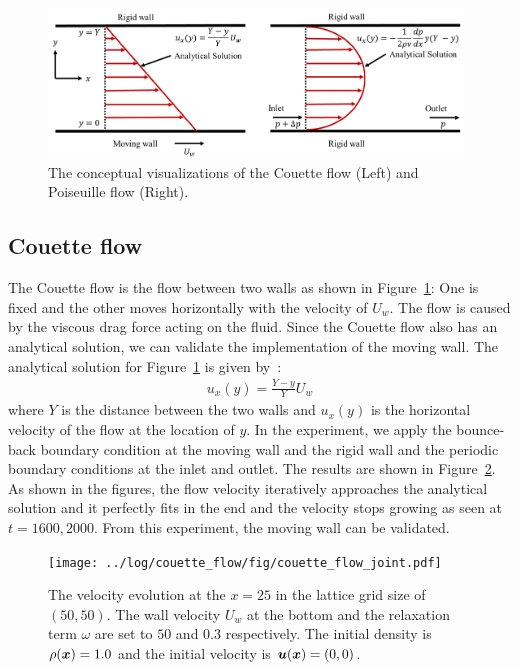 \begin{figure}[H]
  \centering
  \includegraphics[width=0.98\textwidth]{imgs/couette_and_poiseuille.pdf}
  \caption{The conceptual visualizations of the Couette flow (Left) and
  Poiseuille flow (Right).}
  \label{couette-and-poiseuille-conceptual}
\end{figure}


\subsection{Couette flow}
The Couette flow is the flow between two walls as shown in
Figure~\ref{couette-and-poiseuille-conceptual}:
One is fixed and the other moves horizontally with the velocity of $U_w$.
The flow is caused by the viscous drag force acting on the fluid.
Since the Couette flow also has an analytical solution,
we can validate the implementation of the moving wall.
The analytical solution for Figure~\ref{couette-and-poiseuille-conceptual} is given by~\cite{nagy2019graphical}:
\begin{equation}
\begin{aligned}
  u_x(y) =\frac{Y - y}{Y}U_w
\end{aligned}
\end{equation}
where $Y$ is the distance between the two walls
and $u_x(y)$ is the horizontal velocity of the flow
at the location of $y$. 
In the experiment, we apply the bounce-back boundary condition
at the moving wall and the rigid wall
and the periodic boundary conditions at the inlet and outlet.
The results are shown in Figure~\ref{fig:couette-velocity-evolution}.
As shown in the figures, the flow velocity iteratively approaches
the analytical solution and it perfectly fits in the end
and the velocity stops growing as seen at $t=1600, 2000$.
From this experiment, the moving wall can be validated.

\begin{figure}[H]
  \vspace{-1mm}
  \centering
  \texttt{[image: ../log/couette\_flow/fig/couette\_flow\_joint.pdf]}
  \vspace{-5mm}
  \caption{The velocity evolution at
  the $x = 25$ in the lattice grid size of $(50, 50)$.
  The wall velocity $U_w$ at the bottom and the relaxation term $\omega$ are set
  to $50$ and $0.3$ respectively.
  The initial density is $\rho(\boldsymbol{x}) = 1.0$ and the initial velocity is $\boldsymbol{u}(\boldsymbol{x}) = (0, 0)$. 
  \label{fig:couette-velocity-evolution}}
\end{figure}

